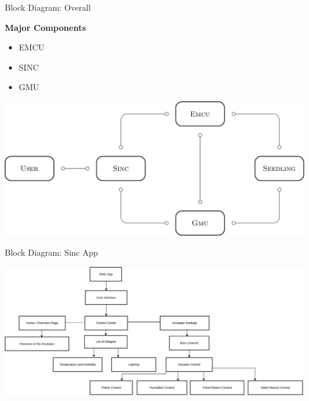 \documentclass{beamer}
\begin{document}
\begin{frame} {Block Diagram: Overall}

    \begin{minipage} {0.29\textwidth}
        \textbf{Major Components}
        \vspace{0.25cm}
        \renewcommand\arraystretch{1.5}
        \begin{itemize}
            \item EMCU
            \item SINC
            \item GMU
        \end{itemize}
    \end{minipage}
    \begin{minipage} {0.7\textwidth}
        \begin{center}
            \includegraphics[width = \textwidth]{overall_block_diagram.pdf}
        \end{center}
    \end{minipage}


\end{frame}

\begin{frame} {Block Diagram: Sinc App}

    \begin{center}

        \includegraphics[width = 1.05\textwidth]{sinc_block_diagram.png}

    \end{center}


\end{frame}
\end{document}
